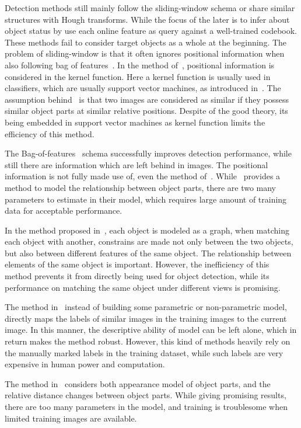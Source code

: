 Detection methods still mainly follow the sliding-window schema or share similar structures with Hough transforms. While the focus of the later is to infer about object status by use each online feature as query against a well-trained codebook. These methods fail to consider target objects as a whole at the beginning. The problem of sliding-window is that it often ignores positional information when also following bag of features~\citep{bgf}. In the method of~\citep{spmk}, positional information is considered in the kernel function. Here a kernel function is usually used in classifiers, which are usually support vector machines, as introduced in~\citep{kmts}. The assumption behind~\citep{spmk} is that two images are considered as similar if they possess similar object parts at similar relative positions. Despite of the good theory, its being embedded in support vector machines as kernel function limits the efficiency of this method.


The Bag-of-features~\citep{bgf} schema successfully improves detection performance, while still there are information which are left behind in images. The positional information is not fully made use of, even the method of~\citep{kmts}. While~\citep{ac3} provides a method to model the relationship between object parts, there are two many parameters to estimate in their model, which requires large amount of training data for acceptable performance.

In the method proposed in~\citep{ac222}, each object is modeled as a graph, when matching each object with another, constrains are made not only between the two objects, but also between different features of the same object. The relationship between elements of the same object is important. However, the inefficiency of this method prevents it from directly being used for object detection, while its performance on matching the same object under different views is promising.

The method in~\citep{lbt1} instead of building some parametric or non-parametric model, directly maps the labels of similar images in the training images to the current image. In this manner, the descriptive ability of model can be left alone, which in return makes the method robust. However, this kind of methods heavily rely on the manually marked labels in the training dataset, while such labels are very expensive in human power and computation.

The method in~\citep{ac3} considers both appearance model of object parts, and the relative distance changes between object parts. While giving promising results, there are too many parameters in the model, and training is troublesome when limited training images are available.

